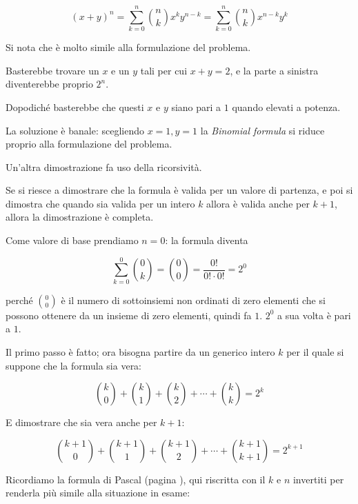 \begin{equation}
(x+y)^n=\sum_{k=0}^{n}{\binom{n}{k}x^{k}y^{n-k}}
=\sum_{k=0}^{n}{\binom{n}{k}x^{n-k}y^{k}}
\end{equation}

Si nota che è molto simile alla formulazione del problema.

Basterebbe trovare un $x$ e un $y$ tali per cui $x+y=2$, e la parte a sinistra diventerebbe proprio $2^n$.

Dopodiché basterebbe che questi $x$ e $y$ siano pari a $1$ quando elevati a potenza.

La soluzione è banale: scegliendo $x=1, y=1$ la \emph{Binomial formula} si riduce proprio alla formulazione del problema.

\vspace{1cm}

Un'altra dimostrazione fa uso della ricorsività.

Se si riesce a dimostrare che la formula è valida per un valore di partenza, e poi si dimostra che quando sia valida per un intero $k$ allora è valida anche per $k+1$, allora la dimostrazione è completa.

Come valore di base prendiamo $n=0$: la formula diventa 

\begin{equation*}
\sum_{k=0}^{0}{\binom{0}{k}}=\binom{0}{0}=\frac{0!}{0!\cdot0!}=2^0
\end{equation*}

perché ${0 \choose 0}$ è il numero di sottoinsiemi non ordinati di zero elementi che si possono ottenere da un insieme di zero elementi, quindi fa $1$.  $2^0$ a sua volta è pari a $1$.

Il primo passo è fatto; ora bisogna partire da un generico intero $k$ per il quale si suppone che la formula sia vera:

\begin{equation*}
\binom{k}{0} + \binom{k}{1} + \binom{k}{2} + \cdots + \binom{k}{k} = 2^k
\end{equation*}

E dimostrare che sia vera anche per $k+1$:


\begin{equation}\label{expr4}
\binom{k+1}{0} + \binom{k+1}{1} + \binom{k+1}{2} + \cdots + \binom{k+1}{k+1} = 2^{k+1}
\end{equation}

Ricordiamo la formula di Pascal (pagina \pageref{formula_pascal}), qui riscritta con il $k$ e $n$ invertiti per renderla più simile alla situazione in esame:


